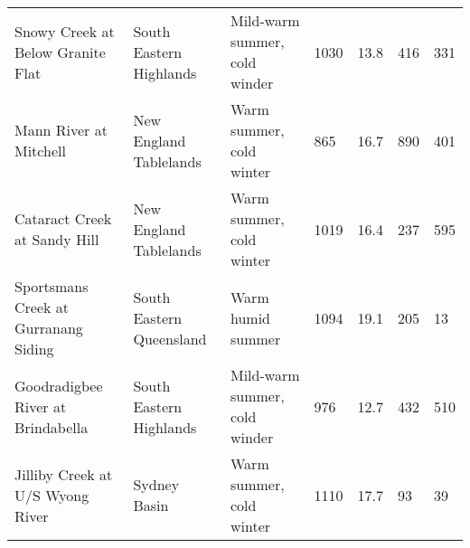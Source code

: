 \begin{table}[]
\begin{tabular}{lllllll}
Snowy Creek at Below Granite Flat      & South Eastern Highlands  & Mild-warm summer, cold winder & 1030                      & 13.8                         & 416                          & 331               \\
Mann River at Mitchell                 & New England Tablelands   & Warm summer, cold winter      & 865                       & 16.7                         & 890                          & 401               \\
Cataract Creek at Sandy Hill           & New England Tablelands   & Warm summer, cold winter      & 1019                      & 16.4                         & 237                          & 595               \\
Sportsmans Creek at Gurranang Siding   & South Eastern Queensland & Warm humid summer             & 1094                      & 19.1                         & 205                          & 13                \\
Goodradigbee River at Brindabella      & South Eastern Highlands  & Mild-warm summer, cold winder & 976                       & 12.7                         & 432                          & 510               \\
Jilliby Creek at U/S Wyong River       & Sydney Basin             & Warm summer, cold winter      & 1110                      & 17.7                         & 93                           & 39               
\end{tabular}
\end{table}

